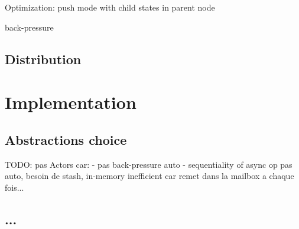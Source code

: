 Optimization: push mode with child states in parent node

back-pressure

\subsection{Distribution}


\section{Implementation}

\subsection{Abstractions choice}

TODO: pas Actors car:
- pas back-pressure auto
- sequentiality of async op pas auto, besoin de stash, in-memory inefficient car remet dans la mailbox a chaque fois...

\subsection{...}



